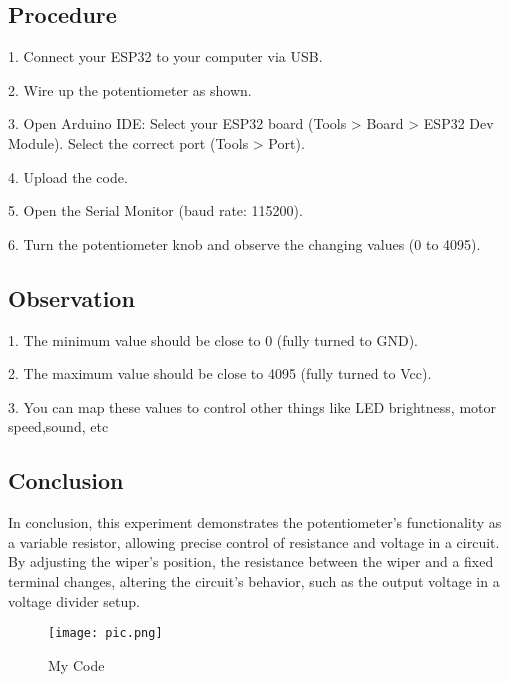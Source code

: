 \documentclass{article}
\begin{document}
\subsection{Procedure}

\item 1. Connect your ESP32 to your computer via USB.
\item 2. Wire up the potentiometer as shown.
\item 3. Open Arduino IDE:
 Select your ESP32 board (Tools > Board > ESP32 Dev Module).
 Select the correct port (Tools > Port).
\item 4. Upload the code.

\item 5. Open the Serial Monitor (baud rate: 115200).
\item 6. Turn the potentiometer knob and observe the changing values (0 to 4095).


\subsection{Observation}
\item  1. The minimum value should be close to 0 (fully turned to GND).

\item  2. The maximum value should be close to 4095 (fully turned to Vcc).
\item  3. You can map these values to control other things like LED brightness, motor speed,sound, etc

\subsection{Conclusion}

In conclusion, this experiment demonstrates the potentiometer’s functionality as a variable resistor, allowing precise control of resistance and voltage in a circuit. By adjusting the wiper’s position, the resistance between the wiper and a fixed terminal changes, altering the circuit’s behavior, such as the output voltage in a voltage divider setup.

\begin{figure}[h]
    \centering
    \texttt{[image: pic.png]}
    \caption{My Code}
    \label{fig:image}
\end{figure}
\end{document}
